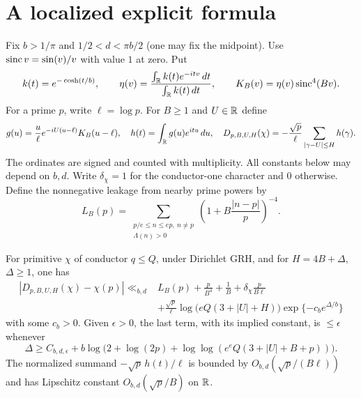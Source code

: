 \section{A localized explicit formula}
\label{sec:localized-kernel}

Fix $b>1/\pi$ and $1/2<d<\pi b/2$ (one may fix the midpoint).
Use $\operatorname{sinc} v=\sin(v)/v$ with value $1$ at zero. Put
\[
 k(t)=e^{-\cosh(t/b)},\qquad
 \eta(v)=\frac{\int_{\mathbb R}k(t)e^{-itv}\,dt}{\int_{\mathbb R}k(t)\,dt},
 \qquad K_B(v)=\eta(v)\operatorname{sinc}^4(Bv).
\]
For a prime $p$, write $\ell=\log p$. For $B\ge1$ and $U\in\mathbb R$ define
\[
 g(u)=\frac{u}{\ell}e^{-iU(u-\ell)}K_B(u-\ell),\quad
 h(t)=\int_{\mathbb R}g(u)e^{itu}\,du,\quad
 D_{p,B,U,H}(\chi)=-\frac{\sqrt p}{\ell}
       \sum_{|\gamma-U|\le H}h(\gamma).
\]
The ordinates are signed and counted with multiplicity. All constants below
may depend on $b,d$. Write $\delta_\chi=1$ for the conductor-one character and
$0$ otherwise. Define the nonnegative leakage from nearby prime powers by
\[
 L_B(p)=\sum_{\substack{p/e\le n\le ep,\ n\ne p\\ \Lambda(n)>0}}
   \left(1+B\frac{|n-p|}{p}\right)^{-4}.
\]

\begin{lemma}\label{lem:kernel-decoder}
For primitive $\chi$ of conductor $q\le Q$, under Dirichlet GRH, and for
$H=4B+\Delta$, $\Delta\ge1$, one has
\begin{align*}
 |D_{p,B,U,H}(\chi)-\chi(p)|\ll_{b,d}{}&L_B(p)+\frac{p}{B^4}+\frac1B
       +\delta_\chi\frac{p}{B\ell}\\[-2pt]
 &+\frac{\sqrt p}{\ell}\log\!\big(eQ(3+|U|+H)\big)
                        \exp\{-c_b e^{\Delta/b}\}
\end{align*}
with some $c_b>0$. Given $\epsilon>0$, the last term, with its implied
constant, is $\le\epsilon$ whenever
\begin{equation}\label{eq:kernel-tail-choice}
 \Delta\ge C_{b,d,\epsilon}+b\log\!\big(2+\log(2p)+
           \log\log(e^e Q(3+|U|+B+p))\big).
\end{equation}
The normalized summand $-\sqrt p\,h(t)/\ell$ is bounded by
$O_{b,d}(\sqrt p/(B\ell))$ and has Lipschitz constant
$O_{b,d}(\sqrt p/B)$ on $\mathbb R$.
\end{lemma}

